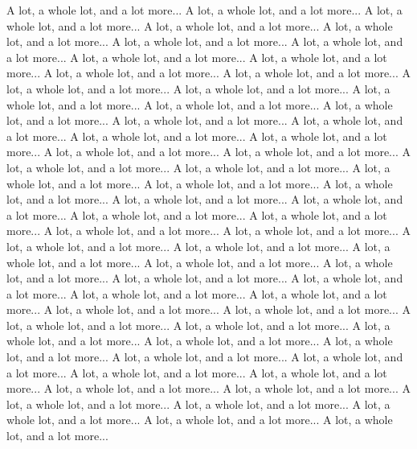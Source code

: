 \documentclass[landscape,a0b,final,a4resizeable]{include/a0poster}
\begin{document}
\begin{poster}
\begin{multicols}{3}
A lot, a whole lot, and a lot more... A lot, a whole lot, and a lot more... A lot, a whole lot, and a lot more... A lot, a whole lot, and a lot more... A lot, a whole lot, and a lot more... A lot, a whole lot, and a lot more... A lot, a whole lot, and a lot more... A lot, a whole lot, and a lot more... A lot, a whole lot, and a lot more... A lot, a whole lot, and a lot more... A lot, a whole lot, and a lot more... A lot, a whole lot, and a lot more... A lot, a whole lot, and a lot more... A lot, a whole lot, and a lot more... A lot, a whole lot, and a lot more... A lot, a whole lot, and a lot more... A lot, a whole lot, and a lot more... A lot, a whole lot, and a lot more... A lot, a whole lot, and a lot more... A lot, a whole lot, and a lot more... A lot, a whole lot, and a lot more... A lot, a whole lot, and a lot more... A lot, a whole lot, and a lot more... A lot, a whole lot, and a lot more... A lot, a whole lot, and a lot more... A lot, a whole lot, and a lot more... A lot, a whole lot, and a lot more... A lot, a whole lot, and a lot more... A lot, a whole lot, and a lot more... A lot, a whole lot, and a lot more... A lot, a whole lot, and a lot more... A lot, a whole lot, and a lot more... A lot, a whole lot, and a lot more... A lot, a whole lot, and a lot more... A lot, a whole lot, and a lot more... A lot, a whole lot, and a lot more... A lot, a whole lot, and a lot more... A lot, a whole lot, and a lot more... A lot, a whole lot, and a lot more... A lot, a whole lot, and a lot more... A lot, a whole lot, and a lot more... A lot, a whole lot, and a lot more... A lot, a whole lot, and a lot more... A lot, a whole lot, and a lot more... A lot, a whole lot, and a lot more... A lot, a whole lot, and a lot more... A lot, a whole lot, and a lot more... A lot, a whole lot, and a lot more... A lot, a whole lot, and a lot more... A lot, a whole lot, and a lot more... A lot, a whole lot, and a lot more... A lot, a whole lot, and a lot more... A lot, a whole lot, and a lot more... A lot, a whole lot, and a lot more... A lot, a whole lot, and a lot more... A lot, a whole lot, and a lot more... A lot, a whole lot, and a lot more... A lot, a whole lot, and a lot more... A lot, a whole lot, and a lot more... A lot, a whole lot, and a lot more...

\end{multicols}
\end{poster}
\end{document}
